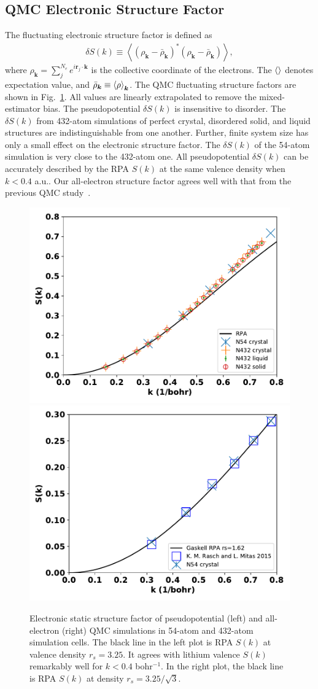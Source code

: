 \documentclass[aps,prl,superscriptaddress]{revtex4-1}
\newcommand{\bs}{\boldsymbol}
\begin{document}
\subsection{QMC Electronic Structure Factor}

The fluctuating electronic structure factor is defined as~\cite{Holzmann2016}
\begin{align}
\delta S(k) \equiv \left\langle
(\rho_{\bs{k}}-\bar{\rho}_{\bs{k}})^* (\rho_{\bs{k}}-\bar{\rho}_{\bs{k}})
\right\rangle,
\end{align}
where $\rho_{\bs{k}} = \sum\limits_j^{N_e} e^{i\bs{r}_j\cdot\bs{k}}$ is the collective coordinate of the electrons. The $\braket{}$ denotes expectation value, and $\bar{\rho}_{\bs{k}}\equiv\braket{\rho}_{\bs{k}}$. The QMC fluctuating structure factors are shown in Fig.~\ref{fig:qmc-dsk}. All values are linearly extrapolated to remove the mixed-estimator bias. The pseudopotential $\delta S(k)$ is insensitive to disorder. The $\delta S(k)$ from 432-atom simulations of perfect crystal, disordered solid, and liquid structures are indistinguishable from one another. Further, finite system size has only a small effect on the electronic structure factor. The $\delta S(k)$ of the 54-atom simulation is very close to the 432-atom one. All pseudopotential $\delta S(k)$ can be accurately described by the RPA $S(k)$ at the same valence density when $k<0.4$ a.u.. Our all-electron structure factor agrees well with that from the previous QMC study~\cite{Rasch2015}.

\begin{figure}[h]
\includegraphics[width=0.48\linewidth]{li40bg_dsk-bfd}
\includegraphics[width=0.48\linewidth]{li40bg_dsk-fc}
\caption{Electronic static structure factor of pseudopotential (left) and all-electron (right) QMC simulations in 54-atom and 432-atom simulation cells. The black line in the left plot is RPA $S(k)$ at valence density $r_s=3.25$. It agrees with lithium valence $S(k)$ remarkably well for $k<0.4$ bohr$^{-1}$. In the right plot, the black line is RPA $S(k)$ at density $r_s=3.25/\sqrt{3}$. \label{fig:qmc-dsk}}
\end{figure}
\end{document}
